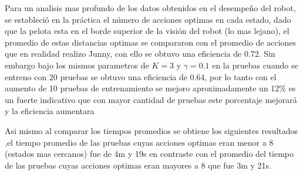 Para un analisis mas profundo de los datos obtenidos en el desempeño del robot, se estableci\'o en la pr\'actica el n\'umero de acciones optimas en cada estado, dado que la pelota esta en el borde superior de la visi\'on del robot (lo mas lejano), el promedio de estas distancias optimas se compararon con el promedio de acciones que en realidad realizo Junny, con ello se obtuvo una eficiencia de $ 0.72$. Sin embargo bajo los mismos parametros de  $K = 3$ y $ \gamma = 0.1 $ en la pruebas cuando se entreno con 20 pruebas se obtuvo una eficiencia de $0.64$, por lo tanto con el aumento de 10 pruebas de entrenamiento se mejoro aproximadamente un 12\% es un fuerte indicativo que con mayor cantidad de pruebas este porcentaje mejorar\'a y la eficiencia aumentara

Asi mismo al comparar los tiempos promedios se obtiene los siguientes resultados ,el tiempo promedio de las pruebas cuyas acciones optimas eran menor a 8 (estados mas cercanos) fue de 4m y 19s en contraste con el promedio del tiempo de las pruebas cuyas acciones optimas eran mayores a 8 que fue  3m y 21s.

 

   


